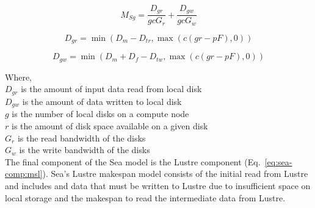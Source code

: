 \documentclass[10pt,journal,compsoc]{IEEEtran}
\begin{document}
      \begin{equation}\label{eq:sea-comp:msd}
          M_{Sg} =  \frac{D_{gr}}{gcG_{r}} + \frac{D_{gw}}{gcG_{w}}
      \end{equation}

      \begin{equation*}\label{eq:sea-comp:ddr}
          D_{gr} = \min{(D_{m} - D_{tr}, \max{(c(gr - pF),0)})}
      \end{equation*}

      \begin{equation*}\label{eq:sea-comp:ddw}
          D_{gw} = \min{(D_{m} + D_{f} - D_{tw}, \max{(c(gr - pF),0)})}
      \end{equation*}

      
      Where, \\
      $D_{gr}$ is the amount of input data read from local disk \\
      $D_{gw}$ is the amount of data written to local disk \\
      $g$ is the number of local disks on a compute node \\
      $r$ is the amount of disk space available on a given disk \\
      $G_{r}$ is the read bandwidth of the disks \\
      $G_{w}$ is the write bandwidth of the disks \\

      The final component of the Sea model is the Lustre component
      (Eq.~\ref{eq:sea-comp:msl}). Sea's Lustre makespan model consists of the
      initial read from Lustre and includes and data that must be written to
      Lustre due to insufficient space on local storage and the makespan to read
      the intermediate data from Lustre.
\end{document}
